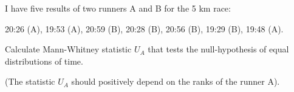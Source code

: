 
\begin{question}
I have five results of two runners A and B for the 5 km race:

20:26 (A), 19:53 (A), 20:59 (B), 20:28 (B), 20:56 (B), 19:29 (B), 19:48 (A).

Calculate Mann-Whitney statistic \(U_A\) that tests the null-hypothesis of equal distributions of time.

(The statistic \(U_A\) should positively depend on the ranks of the runner A).
\end{question}


